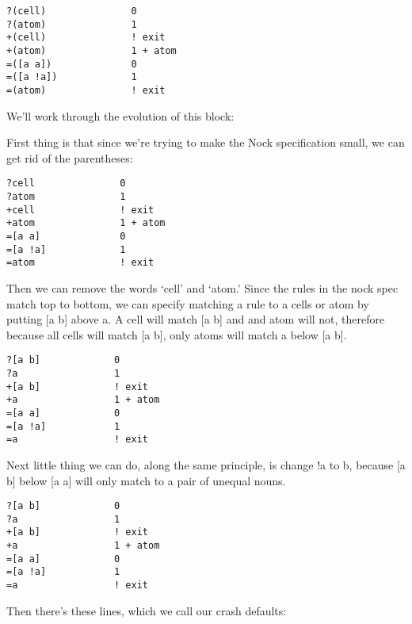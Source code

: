 \begin{framed_shaded}
\begin{Verbatim}[fontsize=\relsize{-2.5},commandchars=\\\{\}]
?(cell)               0
?(atom)               1
+(cell)               ! exit
+(atom)               1 + atom
=([a a])              0
=([a !a])             1
=(atom)               ! exit
\end{Verbatim}
\end{framed_shaded}
We'll work through the evolution of this block:

First thing is that since we're trying to make the Nock specification small, we can get rid of the parentheses:

\begin{framed_shaded}
\begin{Verbatim}[fontsize=\relsize{-2.5},commandchars=\\\{\}]
?cell               0
?atom               1
+cell               ! exit
+atom               1 + atom
=[a a]              0
=[a !a]             1
=atom               ! exit
\end{Verbatim}
\end{framed_shaded}
Then we can remove the words `cell' and `atom.' Since the rules in the nock spec match top to bottom, we can specify matching a rule to a cells or atom by putting [a b] above a. A cell will match [a b] and and atom will not, therefore because all cells will match [a b],
only atoms will match a below [a b].

\begin{framed_shaded}
\begin{Verbatim}[fontsize=\relsize{-2.5},commandchars=\\\{\}]
?[a b]             0
?a                 1
+[a b]             ! exit
+a                 1 + atom
=[a a]             0
=[a !a]            1
=a                 ! exit
\end{Verbatim}
\end{framed_shaded}

Next little thing we can do, along the same principle, is change !a to b, because [a b] below [a a] will only match to a pair of unequal nouns.

\begin{framed_shaded}
\begin{Verbatim}[fontsize=\relsize{-2.5},commandchars=\\\{\}]
?[a b]             0
?a                 1
+[a b]             ! exit
+a                 1 + atom
=[a a]             0
=[a !a]            1
=a                 ! exit
\end{Verbatim}
\end{framed_shaded}
Then there's these lines, which we call our crash defaults:

